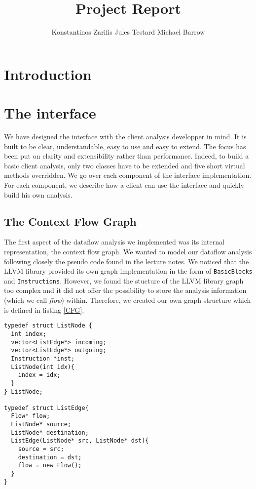 \documentclass[11pt,twocolumn]{article}
\newcommand{\code}{\lstinline}
\begin{document}
\title{Project Report}
\author{Konstantinos Zarifis \quad Jules Testard \quad Michael Barrow}
\maketitle

\section{Introduction}



\section{The interface}

We have designed the interface with the client analysis developper in mind.
It is built to be clear, understandable, easy to use and easy to extend. The focus has been put on clarity and extensibility rather than performance. Indeed, to build a basic client analysis, only two classes have to be extended and five short virtual methods overridden. We go over each component of the interface implementation. For each component, we describe how a client can use the interface and quickly build his own analysis.

\subsection{The Context Flow Graph}
The first aspect of the dataflow analysis we implemented was its internal representation, the context flow graph.
We wanted to model our dataflow analysis following closely the pseudo code found in the lecture notes. We noticed that the LLVM library provided its own graph implementation in the form of \code{BasicBlocks} and \code{Instructions}. However, we found the stucture of the LLVM library graph too complex and it did not offer the possibility to store the analysis information (which we call \emph{flow}) within. Therefore, we created our own graph structure which is defined in listing \ref{CFG}.

\begin{lstlisting}[caption=Context Flow Graph, label=CFG]
typedef struct ListNode {
  int index;
  vector<ListEdge*> incoming;
  vector<ListEdge*> outgoing;
  Instruction *inst;
  ListNode(int idx){
    index = idx;
  }
} ListNode;

typedef struct ListEdge{
  Flow* flow;
  ListNode* source;
  ListNode* destination;
  ListEdge(ListNode* src, ListNode* dst){
    source = src;
    destination = dst;
    flow = new Flow();
  }
} 
\end{lstlisting}
\end{document}
